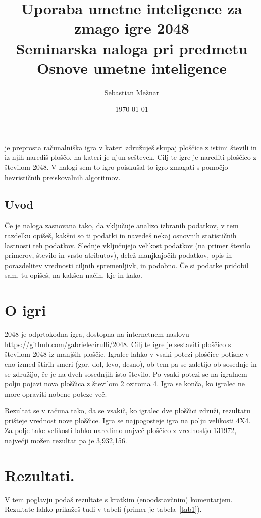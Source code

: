 \documentclass[a4paper,11pt]{article}
\author{Sebastian Mežnar}
\title{
Uporaba umetne inteligence za zmago igre 2048\\
\large Seminarska naloga pri predmetu Osnove umetne inteligence
}
\date{\today}
\begin{document}
\maketitle

  je preprosta računalniška igra v kateri združuješ skupaj ploščice z istimi števili in iz njih narediš ploščo, na kateri je njun seštevek. Cilj te igre je narediti ploščico z številom 2048. V nalogi sem to igro poiskušal to igro zmagati s pomočjo hevrističnih preiskovalnih algoritmov.

\subsection{Uvod}
Če je naloga zasnovana tako, da vključuje analizo izbranih podatkov, v
tem razdelku opišeš, kakšni so ti podatki in navedeš nekaj osnovnih
statističnih lastnosti teh podatkov. Slednje vključujejo velikost
podatkov (na primer število primerov, število in vrsto atributov), delež
manjkajočih podatkov, opis in porazdelitev vrednosti ciljnih
spremenljivk, in podobno. Če si podatke pridobil sam, tu opišeš, na
kakšen način, kje in kako.

\section{O igri}
2048 je odprtokodna igra, dostopna na internetnem naslovu \href{https://github.com/gabrielecirulli/2048}{https://github.com/gabrielecirulli/2048}. Cilj te igre je sestaviti ploščico s številom 2048 iz manjših ploščic. Igralec lahko v vsaki potezi ploščice potisne v eno izmed štirih smeri (gor, dol, levo, desno), ob tem pa se zaletijo ob sosednje in se združijo, če je na dveh sosednjih isto število. Po vsaki potezi se na igralnem polju pojavi nova ploščica z številom 2 oziroma 4. Igra se konča, ko igralec ne more opraviti nobene poteze več.

Rezultat se v računa tako, da se vsakič, ko igralec dve ploščici združi, rezultatu prišteje vrednost nove ploščice. Igra se najpogosteje igra na polju velikosti 4X4. Za polje take velikosti lahko naredimo največ ploščico z vrednostjo 131972, največji možen rezultat pa je 3,932,156.

\section{Rezultati.}

V tem poglavju podaš rezultate s kratkim (enoodstavčnim)
komentarjem. Rezultate lahko prikažeš tudi v tabeli (primer je
tabela~\ref{tab1}).
\end{document}
